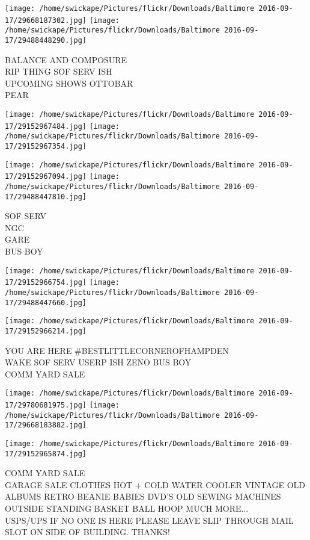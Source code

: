 \documentclass[10pt,letterpaper]{article}
\begin{document}
\texttt{[image: /home/swickape/Pictures/flickr/Downloads/Baltimore 2016-09-17/29668187302.jpg]}
\texttt{[image: /home/swickape/Pictures/flickr/Downloads/Baltimore 2016-09-17/29488448290.jpg]}

BALANCE AND COMPOSURE\\
RIP THING SOF SERV ISH\\
UPCOMING SHOWS OTTOBAR\\
PEAR
\pagebreak

\texttt{[image: /home/swickape/Pictures/flickr/Downloads/Baltimore 2016-09-17/29152967484.jpg]}
\texttt{[image: /home/swickape/Pictures/flickr/Downloads/Baltimore 2016-09-17/29152967354.jpg]}

\texttt{[image: /home/swickape/Pictures/flickr/Downloads/Baltimore 2016-09-17/29152967094.jpg]}
\texttt{[image: /home/swickape/Pictures/flickr/Downloads/Baltimore 2016-09-17/29488447810.jpg]}

SOF SERV\\
NGC\\
GARE\\
BUS BOY
\pagebreak

\texttt{[image: /home/swickape/Pictures/flickr/Downloads/Baltimore 2016-09-17/29152966754.jpg]}
\texttt{[image: /home/swickape/Pictures/flickr/Downloads/Baltimore 2016-09-17/29488447660.jpg]}

\vspace{0.25in}
\texttt{[image: /home/swickape/Pictures/flickr/Downloads/Baltimore 2016-09-17/29152966214.jpg]}

YOU ARE HERE \#BESTLITTLECORNEROFHAMPDEN\\
WAKE SOF SERV USERP ISH ZENO BUS  BOY\\
COMM YARD SALE
\pagebreak

\texttt{[image: /home/swickape/Pictures/flickr/Downloads/Baltimore 2016-09-17/29780681975.jpg]}
\texttt{[image: /home/swickape/Pictures/flickr/Downloads/Baltimore 2016-09-17/29668183882.jpg]}

\texttt{[image: /home/swickape/Pictures/flickr/Downloads/Baltimore 2016-09-17/29152965874.jpg]}

COMM YARD SALE\\
GARAGE SALE CLOTHES HOT + COLD WATER COOLER VINTAGE OLD ALBUMS RETRO BEANIE BABIES DVD'S OLD SEWING MACHINES OUTSIDE STANDING BASKET BALL HOOP MUCH MORE...\\
USPS/UPS IF NO ONE IS HERE PLEASE LEAVE SLIP THROUGH MAIL SLOT ON SIDE OF BUILDING.  THANKS!
\pagebreak
\end{document}
